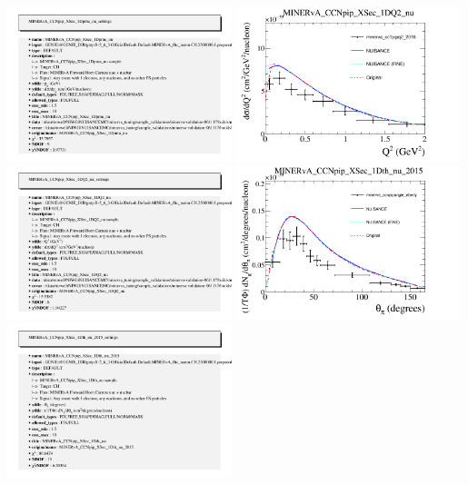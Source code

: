 \documentclass{article}
\begin{document}
\includegraphics[width=0.49\textwidth]{figures/minerva_cc1pipmuonmom_2016_info.png}
\centering
\includegraphics[width=0.49\textwidth]{figures/minerva_cc1pipq2_2016_comp.png}
\includegraphics[width=0.49\textwidth]{figures/minerva_cc1pipq2_2016_info.png}
\centering
\includegraphics[width=0.49\textwidth]{figures/minerva_ccnpipangle_eberly_comp.png}
\includegraphics[width=0.49\textwidth]{figures/minerva_ccnpipangle_eberly_info.png}
\end{document}
